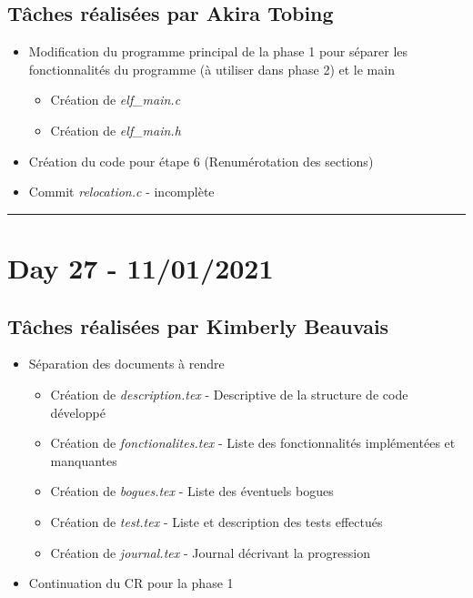 \documentclass[11pt,letterpaper]{article}
\begin{document}
\subsection*{Tâches réalisées par Akira Tobing}
\begin{itemize}
    \item Modification du programme principal de la phase 1 pour séparer les 
    fonctionnalités du programme (à utiliser dans phase 2) et le main 
    \begin{itemize}
        \item Création de \textit{elf\_main.c}  
        \item Création de \textit{elf\_main.h} 
    \end{itemize}
    \item Création du code pour étape 6 (Renumérotation des sections)
    
    \item Commit \textit{relocation.c} - incomplète
\end{itemize}

\noindent\rule{13cm}{0.4pt}

\section*{Day 27 - 11/01/2021}

\subsection*{Tâches réalisées par Kimberly Beauvais}
\begin{itemize}
    \item Séparation des documents à rendre
    \begin{itemize}
        \item Création de \textit{description.tex} - Descriptive de la structure 
        de code développé
        \item Création de \textit{fonctionalites.tex} - Liste des 
        fonctionnalités implémentées et manquantes
        \item Création de \textit{bogues.tex} - Liste des éventuels bogues 
        \item Création de \textit{test.tex} - Liste et description des tests effectués
        \item Création de \textit{journal.tex} - Journal décrivant la progression
    \end{itemize}
    \item Continuation du CR pour la phase 1
\end{itemize}
\end{document}
